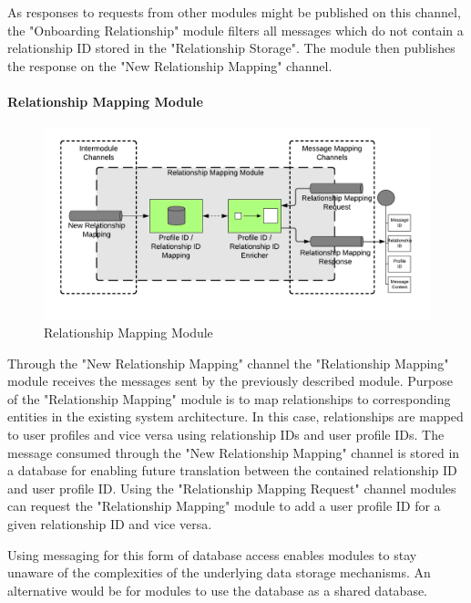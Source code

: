 As responses to requests from other modules might be published on this channel, the "Onboarding Relationship" module filters all messages which do not contain a relationship ID stored in the "Relationship Storage". The module then publishes the response on the "New Relationship Mapping" channel.

\paragraph{Relationship Mapping Module}

\begin{figure}[H]
    \centering
    \includegraphics[scale=0.6]{Diagrams/Integration Architecture 1/Technological Integration/9. Relationship Mapping.pdf}
    \caption{Relationship Mapping Module}
    \label{integration1:relationship_mapping_module}
\end{figure}

Through the "New Relationship Mapping" channel the "Relationship Mapping" module receives the messages sent by the previously described module. Purpose of the "Relationship Mapping" module is to map relationships to corresponding entities in the existing system architecture. In this case, relationships are mapped to user profiles and vice versa using relationship IDs and user profile IDs. The message consumed through the "New Relationship Mapping" channel is stored in a database for enabling future translation between the contained relationship ID and user profile ID. Using the "Relationship Mapping Request" channel modules can request the "Relationship Mapping" module to add a user profile ID for a given relationship ID and vice versa.

Using messaging for this form of database access enables modules to stay unaware of the complexities of the underlying data storage mechanisms. An alternative would be for modules to use the database as a shared database.

